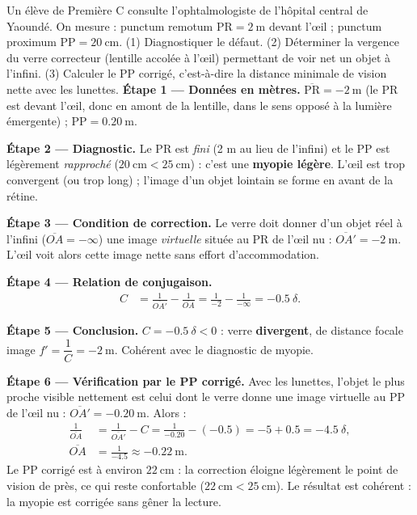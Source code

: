 \documentclass[11pt]{article}
\newcounter{popsec}
\newcounter{popsub}
\newcommand{\courssub}[1]{%
  \stepcounter{popsub}%
  \par\vspace{9pt}\noindent{\popxbold\fontsize{11.5}{13}\selectfont\color{popink}{\color{poporange}\thepopsec.\thepopsub}\hspace{6pt}#1}\par\nopagebreak\vspace{4pt}
}
\begin{document}
\courssub{Exemple de synthèse complet}

\begin{exoresolu}[Œil de PR $= 2\ \mathrm{m}$ et PP $= 20\ \mathrm{cm}$ : diagnostic, correction, vérification]
Un élève de Première C consulte l'ophtalmologiste de l'hôpital central de Yaoundé. On mesure : punctum remotum $\mathrm{PR} = 2\ \mathrm{m}$ devant l'œil ; punctum proximum $\mathrm{PP} = 20\ \mathrm{cm}$. (1) Diagnostiquer le défaut. (2) Déterminer la vergence du verre correcteur (lentille accolée à l'œil) permettant de voir net un objet à l'infini. (3) Calculer le PP corrigé, c'est-à-dire la distance minimale de vision nette avec les lunettes.
\tcblower
\textbf{Étape 1 — Données en mètres.} $\overline{\mathrm{PR}} = -2\ \mathrm{m}$ (le PR est devant l'œil, donc en amont de la lentille, dans le sens opposé à la lumière émergente) ; $\mathrm{PP} = \num{0,20}\ \mathrm{m}$.
\par\textbf{Étape 2 — Diagnostic.} Le PR est \emph{fini} (2 m au lieu de l'infini) et le PP est légèrement \emph{rapproché} ($20\ \mathrm{cm} < 25\ \mathrm{cm}$) : c'est une \textbf{myopie légère}. L'œil est trop convergent (ou trop long) ; l'image d'un objet lointain se forme en avant de la rétine.
\par\textbf{Étape 3 — Condition de correction.} Le verre doit donner d'un objet réel à l'infini ($\overline{OA} = -\infty$) une image \emph{virtuelle} située au PR de l'œil nu : $\overline{OA'} = -2\ \mathrm{m}$. L'œil voit alors cette image nette sans effort d'accommodation.
\par\textbf{Étape 4 — Relation de conjugaison.}
\begin{align*}
C &= \frac{1}{\overline{OA'}} - \frac{1}{\overline{OA}} = \frac{1}{-2} - \frac{1}{-\infty} = -\num{0,5}\ \delta.
\end{align*}
\par\textbf{Étape 5 — Conclusion.} $C = -\num{0,5}\ \delta < 0$ : verre \textbf{divergent}, de distance focale image $f' = \dfrac{1}{C} = -2\ \mathrm{m}$. Cohérent avec le diagnostic de myopie.
\par\textbf{Étape 6 — Vérification par le PP corrigé.} Avec les lunettes, l'objet le plus proche visible nettement est celui dont le verre donne une image virtuelle au PP de l'œil nu : $\overline{OA'} = -\num{0,20}\ \mathrm{m}$. Alors :
\begin{align*}
\frac{1}{\overline{OA}} &= \frac{1}{\overline{OA'}} - C = \frac{1}{-\num{0,20}} - (-\num{0,5}) = -5 + \num{0,5} = -\num{4,5}\ \delta,\\
\overline{OA} &= \frac{1}{-\num{4,5}} \approx -\num{0,22}\ \mathrm{m}.
\end{align*}
Le PP corrigé est à environ $22\ \mathrm{cm}$ : la correction éloigne légèrement le point de vision de près, ce qui reste confortable ($22\ \mathrm{cm} < 25\ \mathrm{cm}$). Le résultat est cohérent : la myopie est corrigée sans gêner la lecture.
\end{exoresolu}
\end{document}
